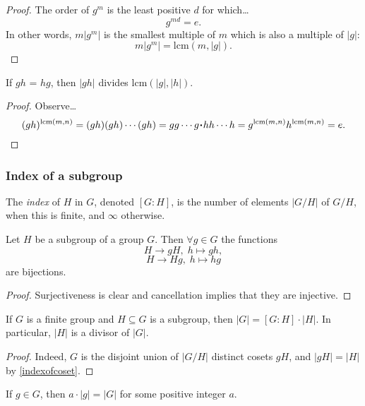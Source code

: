 \begin{proof}
The order of $g^m$ is the least positive $d$ for which\dots
$$g^{md} = e.$$
In other words, $m|g^m|$ is the smallest multiple of $m$ which is also a multiple of $|g|$:
$$m|g^m| = \textrm{lcm}(m,|g|).$$
\end{proof}

\begin{proposition}
If $gh$ = $hg$, then $|gh|$ divides lcm$(|g|,|h|)$.
\end{proposition}

\begin{proof}
Observe\dots
$$(gh)^{\textrm{lcm}(m,n)} = (gh)(gh)\cdots(gh) = gg\cdots g \LargerCdot hh\cdots h = g^{\textrm{lcm}(m,n)}h^{\textrm{lcm}(m,n)} = e.$$
\end{proof}

\subsubsection{Index of a subgroup}\label{subgroupindex}
The \emph{index} of $H$ in $G$, denoted $[G:H]$, is the number of elements $|G/H|$ of $G/H$, when this is finite, and $\infty$ otherwise.

\begin{lemma}
\label{indexofcoset}
Let $H$ be a subgroup of a group $G$. Then $\forall g \in G$ the functions
$$H \rightarrow gH, \; h \mapsto gh,$$
$$H \rightarrow Hg, \; h \mapsto hg$$
are bijections.
\end{lemma}

\begin{proof}
Surjectiveness is clear and cancellation implies that they are injective.
\end{proof}


\begin{corollary}
\label{lagrangesthm}
If $G$ is a finite group and $H \subseteq G$ is a subgroup, then $|G| = [G : H] \cdot |H|$. In particular, $|H|$ is a divisor of $|G|$.
\end{corollary}

\begin{proof}
Indeed, $G$ is the disjoint union of $|G/H|$ distinct cosets $gH$, and $|gH| = |H|$ by \ref{indexofcoset}.
\end{proof}

\begin{corollary}
\label{elementorderdividesgrouporder}
If $g \in G$, then $a \cdot |g| = |G|$ for some positive integer $a$.
\end{corollary}